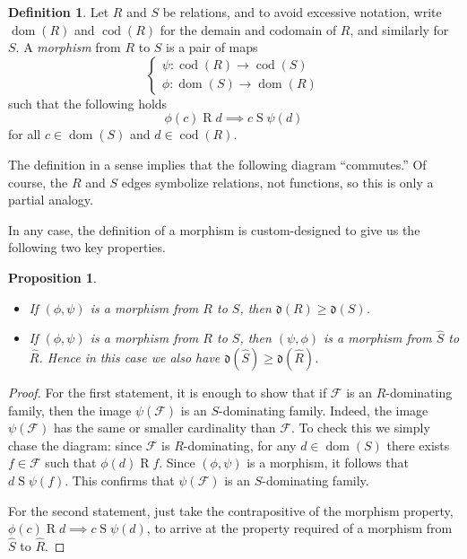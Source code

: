 \documentclass[11pt,oneside]{amsbook}
\DeclareMathOperator{\dom}{dom}
\DeclareMathOperator{\cod}{cod}
\theoremstyle{definition}
\theoremstyle{plain}
\newtheorem{prop}[thm]{Proposition}
\theoremstyle{definition}
\newtheorem{defn}[thm]{Definition}
\theoremstyle{remark}
\numberwithin{equation}{section}
\numberwithin{figure}{section}
\begin{document}
\begin{defn}
  Let $R$ and $S$ be relations, and to avoid excessive notation, write $\dom(R)$ and $\cod(R)$ for the demain and codomain of $R$, and similarly for $S$. A \emph{morphism} from $R$ to $S$ is a pair of maps
\[\begin{cases}\psi\colon\cod(R)\to\cod(S)\\\phi\colon\dom(S)\to\dom(R)\end{cases}
\]
such that the following holds
\[\phi(c)\mathrel{R}d\implies c\mathrel{S}\psi(d)
\]
for all $c\in\dom(S)$ and $d\in\cod(R)$.
\end{defn}

The definition in a sense implies that the following diagram ``commutes.'' Of course, the $R$ and $S$ edges symbolize relations, not functions, so this is only a partial analogy.
\begin{center}
\end{center}
In any case, the definition of a morphism is custom-designed to give us the following two key properties.

\begin{prop}
  \label{prop:morphism}
  \begin{itemize}
  \item If $(\phi,\psi)$ is a morphism from $R$ to $S$, then $\mathfrak d(R)\geq\mathfrak d(S)$.
  \item If $(\phi,\psi)$ is a morphism from $R$ to $S$, then $(\psi,\phi)$ is a morphism from $\hat S$ to $\hat R$. Hence in this case we also have $\mathfrak d(\hat S)\geq\mathfrak d(\hat R)$.
  \end{itemize}
\end{prop}

\begin{proof}
  For the first statement, it is enough to show that if $\mathcal F$ is an $R$-dominating family, then the image $\psi(\mathcal F)$ is an $S$-dominating family. Indeed, the image $\psi(\mathcal F)$ has the same or smaller cardinality than $\mathcal F$. To check this we simply chase the diagram: since $\mathcal F$ is $R$-dominating, for any $d\in\dom(S)$ there exists $f\in\mathcal F$ such that $\phi(d)\mathrel{R}f$. Since $(\phi,\psi)$ is a morphism, it follows that $d\mathrel{S}\psi(f)$. This confirms that $\psi(\mathcal F)$ is an $S$-dominating family.

  For the second statement, just take the contrapositive of the morphism property, $\phi(c)\mathrel R d\implies c\mathrel S\psi(d)$, to arrive at the property required of a morphism from $\hat S$ to $\hat R$.
\end{proof}
\end{document}
